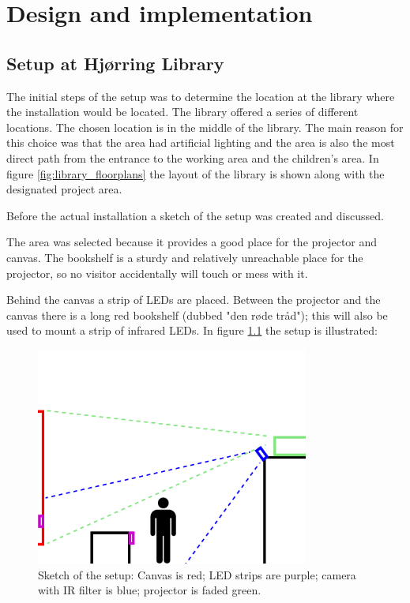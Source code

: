 \chapter{Design and implementation}\label{implementation}
\section{Setup at Hj{\o}rring Library}
The initial steps of the setup was to determine the location at the library where the installation would be located. The library offered a series of different locations. The chosen location is in the middle of the library. The main reason for this choice was that the area had artificial lighting and the area is also the most direct path from the entrance to the working area and the children's area. In figure \ref{fig:library_floorplans} the layout of the library is shown along with the designated project area.


Before the actual installation a sketch of the setup was created and discussed.

The area was selected because it provides a good place for the projector and canvas. The bookshelf is a sturdy and relatively unreachable place for the projector, so no visitor accidentally will touch or mess with it.

Behind the canvas a strip of LEDs are placed. Between the projector and the canvas there is a long red bookshelf (dubbed "den r{\o}de tr{\aa}d"); this will also be used to mount a strip of infrared LEDs. In figure \ref{fig:setup_model} the setup is illustrated:

\begin{figure}[htbp] 
\centering 
\includegraphics[width=0.8\textwidth]{Pictures/Setup/sideview_camera_with_person_two_strips.png} 
\caption{Sketch of the setup: Canvas is red; LED strips are purple; camera with IR filter is blue; projector is faded green.} 
\label{fig:setup_model} 
\end{figure}

